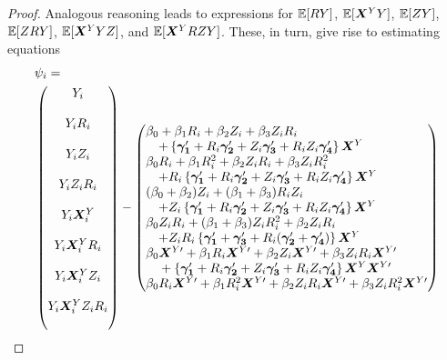 \documentclass{statsoc} %
\begin{document}
\begin{proof}
Analogous reasoning leads to expressions for $\mathbb{E}[RY]$, $\mathbb{E}[\bm{X}^Y Y]$, $\mathbb{E}[ZY]$,  $\mathbb{E}[ZRY]$, $\mathbb{E}[\bm{X}^Y YZ]$, and $\mathbb{E}[\bm{X}^Y RZY]$.
These, in turn, give rise to estimating equations
\begin{equation*}
\begin{split}
  &\psi_i=\\ &\begin{pmatrix}
  Y_i\\
  \phantom{}\\
  Y_i\ri\\
    \phantom{}\\
  Y_iZ_i\\
  \phantom{}\\
  Y_iZ_i\ri\\
  \phantom{}\\
  Y_i\bxy_i\\
  \phantom{}\\
  Y_i\bxy_i\ri\\
  \phantom{}\\
  Y_i\bxy_iZ_i\\
  \phantom{}\\
  Y_i\bxy_iZ_i\ri\\
  \phantom{}\end{pmatrix} - \begin{pmatrix*}[l]
    \beta_0+\beta_1R_i+\beta_2Z_i+\beta_3Z_iR_i\\
    \quad+\left\{\bm{\gamma_1}'+R_i\bm{\gamma_2}'+Z_i\bm{\gamma_3}'+R_iZ_i\bm{\gamma_4}'\right\}\bxy\\
    \beta_0\ri+\beta_1R_i^2+\beta_2Z_i\ri+\beta_3Z_iR_i^2\\
    \quad+\ri\left\{\bm{\gamma_1}'+R_i\bm{\gamma_2}'+Z_i\bm{\gamma_3}'+R_iZ_i\bm{\gamma_4}'\right\}\bxy\\
    (\beta_0+\beta_2)Z_i+(\beta_1+\beta_3)R_iZ_i\\
    \quad+Z_i\left\{\bm{\gamma_1}'+R_i\bm{\gamma_2}'+Z_i\bm{\gamma_3}'+R_iZ_i\bm{\gamma_4}'\right\}\bxy\\
    \beta_0Z_i\ri+(\beta_1+\beta_3)Z_iR_i^2+\beta_2Z_i\ri\\
    \quad+Z_iR_i\left\{\bm{\gamma_1}'+\bm{\gamma_3}'+R_i(\bm{\gamma_2}'+\bm{\gamma_4}')\right\}\bxy \\
    \beta_0\bxyt+\beta_1R_i\bxyt+\beta_2Z_i\bxyt+\beta_3Z_iR_i\bxyt\\
    \quad {}+\left\{\bm{\gamma_1}'+R_i\bm{\gamma_2}'+Z_i\bm{\gamma_3}'+R_iZ_i\bm{\gamma_4}'\right\}\bxy\bxyt\\
    \beta_0\ri\bxyt+\beta_1R_i^2\bxyt+\beta_2Z_i\ri\bxyt+\beta_3Z_iR_i^2\bxyt\\

\end{pmatrix*}
\end{split}
\end{equation*}
\end{proof}
\end{document}
